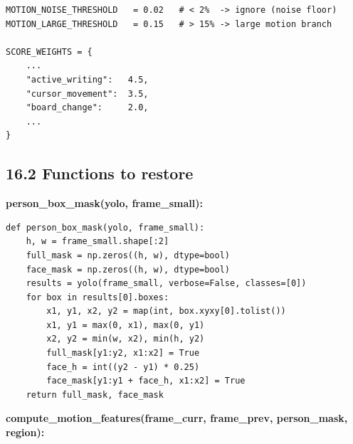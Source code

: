 \documentclass[11pt]{article}
\begin{document}
\begin{verbatim}
MOTION_NOISE_THRESHOLD   = 0.02   # < 2%  -> ignore (noise floor)
MOTION_LARGE_THRESHOLD   = 0.15   # > 15% -> large motion branch

SCORE_WEIGHTS = {
    ...
    "active_writing":   4.5,
    "cursor_movement":  3.5,
    "board_change":     2.0,
    ...
}
\end{verbatim}

\subsection*{16.2 Functions to restore}

\textbf{person\_box\_mask(yolo, frame\_small):}

\begin{verbatim}
def person_box_mask(yolo, frame_small):
    h, w = frame_small.shape[:2]
    full_mask = np.zeros((h, w), dtype=bool)
    face_mask = np.zeros((h, w), dtype=bool)
    results = yolo(frame_small, verbose=False, classes=[0])
    for box in results[0].boxes:
        x1, y1, x2, y2 = map(int, box.xyxy[0].tolist())
        x1, y1 = max(0, x1), max(0, y1)
        x2, y2 = min(w, x2), min(h, y2)
        full_mask[y1:y2, x1:x2] = True
        face_h = int((y2 - y1) * 0.25)
        face_mask[y1:y1 + face_h, x1:x2] = True
    return full_mask, face_mask
\end{verbatim}

\textbf{compute\_motion\_features(frame\_curr, frame\_prev, person\_mask, region):}
\end{document}
